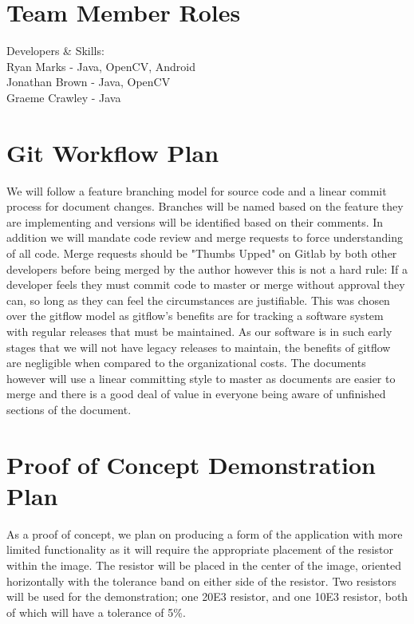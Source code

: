 \documentclass{article}
\begin{document}
\section{Team Member Roles}

Developers \& Skills: \\
Ryan Marks - Java, OpenCV, Android \\
Jonathan Brown - Java, OpenCV \\
Graeme Crawley - Java \\

\section{Git Workflow Plan}

We will follow a feature branching model for source code and a linear commit process for document changes. Branches will be named based on the feature they are implementing and versions will be identified based on their comments.
In addition we will mandate code review and merge requests to force understanding of all code.
Merge requests should be "Thumbs Upped" on Gitlab by both other developers before being merged by the author however this is not a hard rule:
If a developer feels they must commit code to master or merge without approval they can, so long as they can feel the circumstances are justifiable.
This was chosen over the gitflow model as gitflow's benefits are for tracking a software system with regular releases that must be maintained.
As our software is in such early stages that we will not have legacy releases to maintain, the benefits of gitflow are negligible when compared to the organizational costs.
The documents however will use a linear committing style to master as documents are easier to merge and there is a good deal of value in everyone being aware of unfinished sections of the document.

\section{Proof of Concept Demonstration Plan}
As a proof of concept, we plan on producing a form of the application with more limited functionality as it will require the appropriate placement of the resistor within the image. The resistor will be placed in the center of the image, oriented horizontally with the tolerance band on either side of the resistor. Two resistors will be used for the demonstration; one 20E3 resistor, and one 10E3 resistor, both of which will have a tolerance of 5\%.
\end{document}
